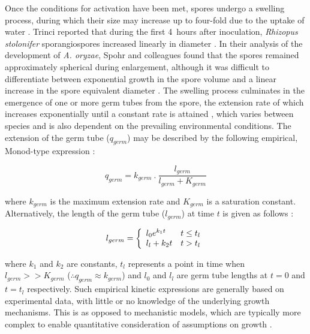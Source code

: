 Once the conditions for activation have been met, spores undergo a swelling process, during which their size may increase up to four-fold due to the uptake of water \cite{robson1999}. Trinci reported that during the first 4~hours after inoculation, \emph{Rhizopus stolonifer} sporangiospores increased linearly in diameter \cite{trinci1971a}. In their analysis of the development of \emph{A. oryzae}, Spohr and colleagues found that the spores remained approximately spherical during enlargement, although it was difficult to differentiate between exponential growth in the spore volume and a linear increase in the spore equivalent diameter \cite{spohr1998}. The swelling process culminates in the emergence of one or more germ tubes from the spore, the extension rate of which increases exponentially until a constant rate is attained \cite{trinci1971a}, which varies between species and is also dependent on the prevailing environmental conditions. The extension of the germ tube ($q_{germ}$) may be described by the following empirical, Monod-type expression \cite{spohr1998}:

\begin{equation}\label{eq:qgerm}
	q_{germ} = k_{germ} \ . \ \frac{l_{germ}}{l_{germ} + K_{germ}}
\end{equation}

\noindent where $k_{germ}$ is the maximum extension rate and $K_{germ}$ is a saturation constant. Alternatively, the length of the germ tube ($l_{germ}$) at time $t$ is given as follows \cite{prosser1995}:

\begin{equation}
	l_{germ} = \left \{ \begin{array}{l l}	l_0 e^{k_1 t} & t \leq t_l\\
																				l_l + k_2 t & t > t_l\end{array} \right .
\end{equation}

\noindent where $k_1$ and $k_2$ are constants, $t_l$ represents a point in time when $l_{germ} >> K_{germ}$ ($\therefore q_{germ} \approx k_{germ}$) and $l_0$ and $l_l$ are germ tube lengths at $t=0$ and $t=t_l$ respectively. Such empirical kinetic expressions are generally based on experimental data, with little or no knowledge of the underlying growth mechanisms. This is as opposed to mechanistic models, which are typically more complex to enable quantitative consideration of assumptions on growth \cite{prosser1995}.

